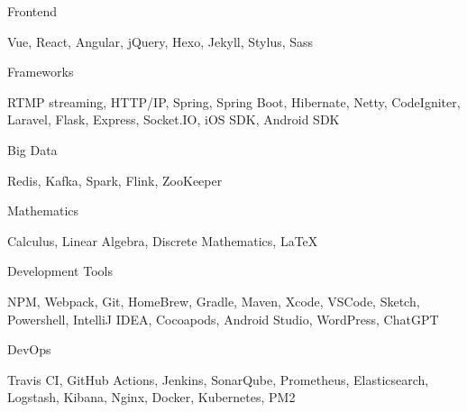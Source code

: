 \begin{cventries}
  \cventry
    {Frontend} %
    {} %
    {} %
    {} %
    {
      \begin{cvitems}
        \item {Vue, React, Angular, jQuery, Hexo, Jekyll, Stylus, Sass}
      \end{cvitems}
    }

  \cventry
    {Frameworks} %
    {} %
    {} %
    {} %
    {
      \begin{cvitems}
        \item {RTMP streaming, HTTP/IP, Spring, Spring Boot, Hibernate, Netty, CodeIgniter, Laravel, Flask, Express, Socket.IO, iOS SDK, Android SDK}
      \end{cvitems}
    }

  \cventry
    {Big Data} %
    {} %
    {} %
    {} %
    {
      \begin{cvitems}
        \item {Redis, Kafka, Spark, Flink, ZooKeeper}
      \end{cvitems}
    }

  \cventry
    {Mathematics} %
    {} %
    {} %
    {} %
    {
      \begin{cvitems}
        \item {Calculus, Linear Algebra, Discrete Mathematics, LaTeX}
      \end{cvitems}
    }

  \cventry
    {Development Tools} %
    {} %
    {} %
    {} %
    {
      \begin{cvitems}
        \item {NPM, Webpack, Git, HomeBrew, Gradle, Maven, Xcode, VSCode, Sketch, Powershell, IntelliJ IDEA, Cocoapods, Android Studio, WordPress, ChatGPT}
      \end{cvitems}
    }

  \cventry
    {DevOps} %
    {} %
    {} %
    {} %
    {
      \begin{cvitems}
        \item {Travis CI, GitHub Actions, Jenkins, SonarQube, Prometheus, Elasticsearch, Logstash, Kibana, Nginx, Docker, Kubernetes, PM2}
      \end{cvitems}
    }


\end{cventries}
